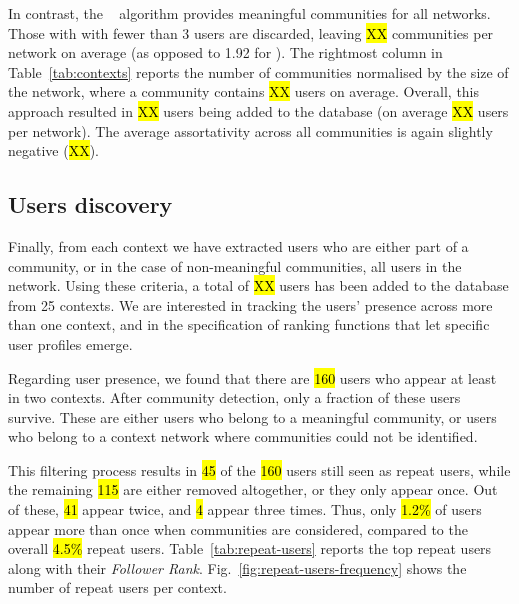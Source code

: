 \documentclass[runningheads]{llncs}
\begin{document}
In contrast, the \infomap~ algorithm provides meaningful communities for all networks.
Those with with fewer than 3 users are discarded, leaving  \hl{XX} communities per network on average (as opposed to 1.92 for \demon).
The rightmost column in Table~\ref{tab:contexts} reports the number of communities normalised by the size of the network, 
where a community contains \hl{XX} users on average. 
Overall, this approach resulted in \hl{XX} users being added to the database (on average \hl{XX} users per network).
The average assortativity across all communities is again slightly negative (\hl{XX}).





\subsection{Users discovery}  \label{sec:users}

Finally, from each context we have extracted users who are either part of a community, or in the case of non-meaningful communities, all users in the network.
Using these criteria, a total of \hl{XX} users has been added to the database from 25 contexts.
We are interested in tracking the users' presence across more than one context, and in the specification of ranking functions that let specific user profiles emerge.

Regarding user presence, we found that there are \hl{160} users who appear at least in two contexts. 
After community detection, only a fraction of these users survive. 
These are either users who belong to a meaningful community, or users who belong to a context network where communities could not be identified.

This filtering process results in \hl{45} of the \hl{160} users still seen as repeat users, while the remaining \hl{115} are either removed altogether, or they only appear once. 
Out of these, \hl{41} appear twice, and \hl{4} appear three times. 
Thus, only \hl{1.2\%} of users appear more than once when communities are considered, compared to the overall \hl{4.5\%} repeat users.
%
Table~\ref{tab:repeat-users} reports the top repeat users along with their \textit{Follower Rank}.  
%
Fig.~\ref{fig:repeat-users-frequency} shows the number of repeat users per context. 
\end{document}
